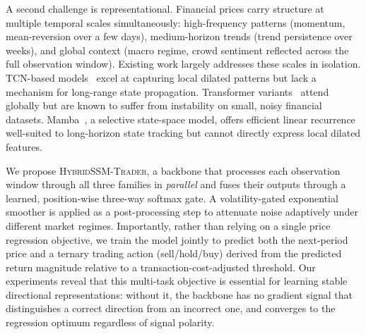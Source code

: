 \documentclass[runningheads]{llncs}
\begin{document}
A second challenge is representational.  Financial prices carry structure at
multiple temporal scales simultaneously: high-frequency patterns (momentum,
mean-reversion over a few days), medium-horizon trends (trend persistence over
weeks), and global context (macro regime, crowd sentiment reflected across the
full observation window).  Existing work largely addresses these scales in
isolation.  TCN-based models~\cite{bai2018empirical} excel at capturing local
dilated patterns but lack a mechanism for long-range state propagation.
Transformer variants~\cite{zhou2021informer,wu2021autoformer} attend globally but
are known to suffer from instability on small, noisy financial datasets.
Mamba~\cite{gu2023mamba}, a selective state-space model, offers efficient linear
recurrence well-suited to long-horizon state tracking but cannot directly
express local dilated features.

We propose \textsc{HybridSSM-Trader}, a backbone that processes each observation window
through all three families in \emph{parallel} and fuses their outputs through a
learned, position-wise three-way softmax gate.  A volatility-gated exponential
smoother is applied as a post-processing step to attenuate noise adaptively under
different market regimes.  Importantly, rather than relying on a single price
regression objective, we train the model jointly to predict both the next-period
price and a ternary trading action (sell/hold/buy) derived from the predicted
return magnitude relative to a transaction-cost-adjusted threshold.  Our
experiments reveal that this multi-task objective is essential for learning
stable directional representations: without it, the backbone has no gradient
signal that distinguishes a correct direction from an incorrect one, and
converges to the regression optimum regardless of signal polarity.
\end{document}
